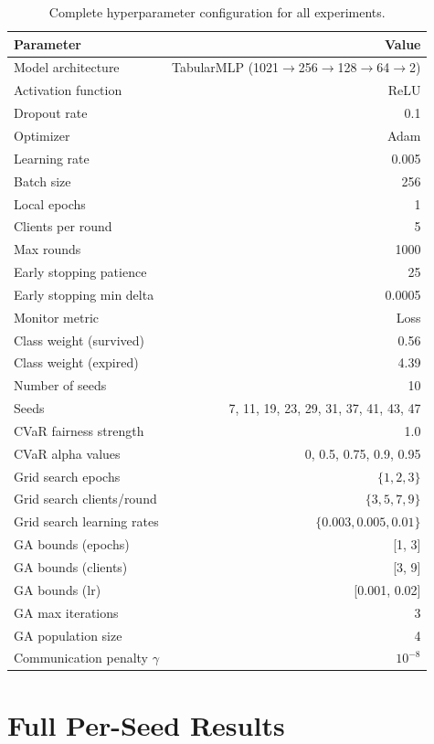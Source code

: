 \documentclass[11pt,a4paper]{report}
\begin{document}
\begin{table}[H]
\centering
\caption{Complete hyperparameter configuration for all experiments.}
\label{tab:hyperparams}
\begin{tabular}{lr}
\toprule
\textbf{Parameter} & \textbf{Value} \\
\midrule
Model architecture & TabularMLP (1021$\to$256$\to$128$\to$64$\to$2) \\
Activation function & ReLU \\
Dropout rate & 0.1 \\
Optimizer & Adam \\
Learning rate & 0.005 \\
Batch size & 256 \\
Local epochs & 1 \\
Clients per round & 5 \\
Max rounds & 1000 \\
Early stopping patience & 25 \\
Early stopping min delta & 0.0005 \\
Monitor metric & Loss \\
Class weight (survived) & 0.56 \\
Class weight (expired) & 4.39 \\
Number of seeds & 10 \\
Seeds & 7, 11, 19, 23, 29, 31, 37, 41, 43, 47 \\
CVaR fairness strength & 1.0 \\
CVaR alpha values & 0, 0.5, 0.75, 0.9, 0.95 \\
Grid search epochs & $\{1, 2, 3\}$ \\
Grid search clients/round & $\{3, 5, 7, 9\}$ \\
Grid search learning rates & $\{0.003, 0.005, 0.01\}$ \\
GA bounds (epochs) & [1, 3] \\
GA bounds (clients) & [3, 9] \\
GA bounds (lr) & [0.001, 0.02] \\
GA max iterations & 3 \\
GA population size & 4 \\
Communication penalty $\gamma$ & $10^{-8}$ \\
\bottomrule
\end{tabular}
\end{table}


\chapter{Full Per-Seed Results}
\end{document}
